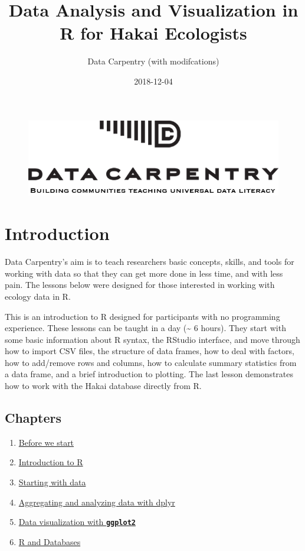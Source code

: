 \documentclass[]{book}
\title{Data Analysis and Visualization in R for Hakai Ecologists}
\author{Data Carpentry (with modifcations)}
\date{2018-12-04}
\providecommand{\tightlist}{%
  \setlength{\itemsep}{0pt}\setlength{\parskip}{0pt}}
\begin{document}
\maketitle

{
\setcounter{tocdepth}{1}
\tableofcontents
}
\begin{figure}
\centering
\includegraphics{./img/DC-logo-vision.png}
\caption{}
\end{figure}

\chapter{Introduction}\label{introduction}

Data Carpentry's aim is to teach researchers basic concepts, skills, and
tools for working with data so that they can get more done in less time,
and with less pain. The lessons below were designed for those interested
in working with ecology data in R.

This is an introduction to R designed for participants with no
programming experience. These lessons can be taught in a day
(\textasciitilde{} 6 hours). They start with some basic information
about R syntax, the RStudio interface, and move through how to import
CSV files, the structure of data frames, how to deal with factors, how
to add/remove rows and columns, how to calculate summary statistics from
a data frame, and a brief introduction to plotting. The last lesson
demonstrates how to work with the Hakai database directly from R.

\section{Chapters}\label{chapters}

\begin{enumerate}
\def\labelenumi{\arabic{enumi}.}
\tightlist
\item
  \href{00-before-we-start.html}{Before we start}
\item
  \href{01-intro-to-r.html}{Introduction to R}
\item
  \href{02-starting-with-data.html}{Starting with data}
\item
  \href{03-dplyr.html}{Aggregating and analyzing data with dplyr}
\item
  \href{04-visualization-ggplot2.html}{Data visualization with
  \textbf{\texttt{ggplot2}}}
\item
  \href{05-R-api.html}{R and Databases}
\end{enumerate}
\end{document}
